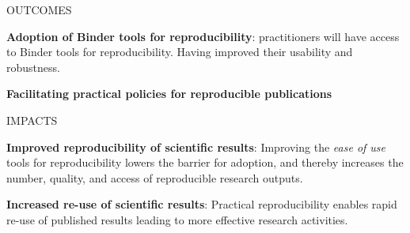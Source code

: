 \begin{multicols}{2}
\begin{summarybox}{OUTCOMES}

\textbf{Adoption of Binder tools for reproducibility}:
practitioners will have access to Binder tools for reproducibility.
Having improved their usability and robustness.

\textbf{Facilitating practical policies for reproducible publications}
\end{summarybox}
\begin{summarybox}{IMPACTS}

\textbf{Improved reproducibility of scientific results}: Improving the \emph{ease of use} tools for reproducibility
lowers the barrier for adoption, and thereby increases the number, quality, and
access of reproducible research outputs.

\textbf{Increased re-use of scientific results}: Practical reproducibility
enables rapid re-use of published results leading to more effective research activities.
\end{summarybox}
\end{multicols}
\clearpage

%

%




